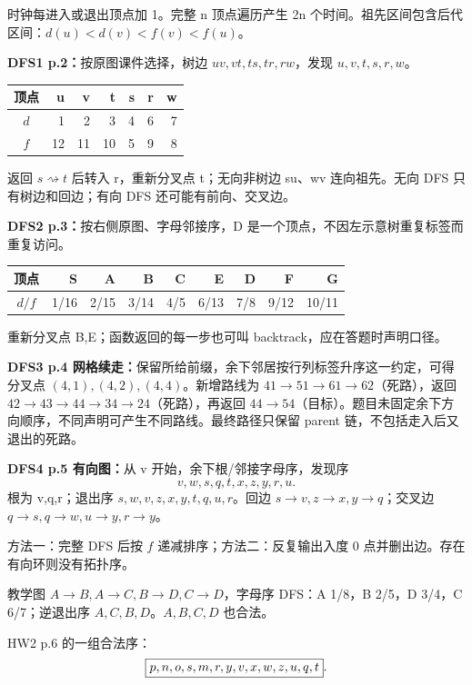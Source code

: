 时钟每进入或退出顶点加 1。完整 n 顶点遍历产生 2n 个时间。祖先区间包含后代区间：$d(u)<d(v)<f(v)<f(u)$。

\textbf{DFS1 p.2：}按原图课件选择，树边 $uv,vt,ts,tr,rw$，发现 $u,v,t,s,r,w$。
\begin{center}\begin{tabular}{c|rrrrrr}\toprule
顶点&u&v&t&s&r&w\\\midrule
$d$&1&2&3&4&6&7\\$f$&12&11&10&5&9&8\\\bottomrule
\end{tabular}\end{center}
返回 $s\rightsquigarrow t$ 后转入 r，重新分叉点 t；无向非树边 su、wv 连向祖先。无向 DFS 只有树边和回边；有向 DFS 还可能有前向、交叉边。

\textbf{DFS2 p.3：}按右侧原图、字母邻接序，D 是一个顶点，不因左示意树重复标签而重复访问。
\begin{center}\begin{tabular}{c|rrrrrrrr}\toprule
顶点&S&A&B&C&E&D&F&G\\\midrule
$d/f$&1/16&2/15&3/14&4/5&6/13&7/8&9/12&10/11\\\bottomrule
\end{tabular}\end{center}
重新分叉点 B,E；函数返回的每一步也可叫 backtrack，应在答题时声明口径。

\textbf{DFS3 p.4 网格续走：}保留所给前缀，余下邻居按行列标签升序这一约定，可得分叉点 $(4,1),(4,2),(4,4)$。新增路线为 $41\to51\to61\to62$（死路），返回 $42\to43\to44\to34\to24$（死路），再返回 $44\to54$（目标）。题目未固定余下方向顺序，不同声明可产生不同路线。最终路径只保留 parent 链，不包括走入后又退出的死路。

\textbf{DFS4 p.5 有向图：}从 v 开始，余下根/邻接字母序，发现序
\[
v,w,s,q,t,x,z,y,r,u.
\]
根为 v,q,r；退出序 $s,w,v,z,x,y,t,q,u,r$。回边 $s\to v,z\to x,y\to q$；交叉边 $q\to s,q\to w,u\to y,r\to y$。

\label{ex:topo}
方法一：完整 DFS 后按 $f$ 递减排序；方法二：反复输出入度 0 点并删出边。存在有向环则没有拓扑序。

教学图 $A\to B,A\to C,B\to D,C\to D$，字母序 DFS：A 1/8，B 2/5，D 3/4，C 6/7；逆退出序 $A,C,B,D$。$A,B,C,D$ 也合法。

HW2 p.6 的一组合法序：
\[
\boxed{p,n,o,s,m,r,y,v,x,w,z,u,q,t}.
\]

